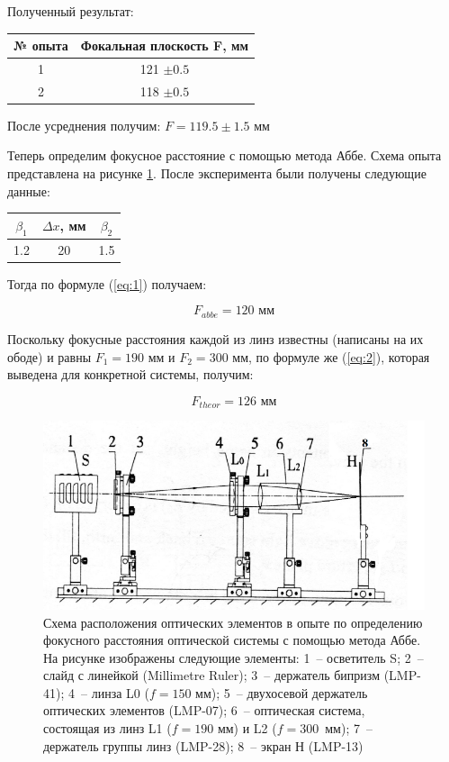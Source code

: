 \documentclass[a4paper, 12pt]{article}
\begin{document}
Полученный результат:

\begin{center}
	\begin{tabular}{|c|c|}
		\hline
		№ опыта & Фокальная плоскость F, мм\\
		\hline
		1 & 121 $\pm 0.5$  \\
		\hline
		2 & 118 $ \pm 0.5$ \\
		\hline
	\end{tabular}
\end{center}

После усреднения получим:
$F = 119.5\pm 1.5$ мм

Теперь определим фокусное расстояние с помощью метода Аббе. Схема опыта представлена на рисунке \ref{fig:3_1}. После эксперимента были получены следующие данные:

\begin{center}
	\begin{tabular}{|c|c|c|}
		\hline
		$\beta_1$ & $\Delta x$, мм & $\beta_2$ \\
		\hline
		1.2 & 20 & 1.5 \\
		\hline
	\end{tabular}
\end{center}

Тогда по формуле (\ref{eq:1}) получаем:

\begin{equation*}
	F_{abbe} = 120 \text{ мм}
\end{equation*}

Поскольку фокусные расстояния каждой из линз известны (написаны на их ободе) и равны $F_1 = 190 \text{ мм}$ и $F_2 = 300 \text{ мм}$, по формуле же (\ref{eq:2}), которая выведена для конкретной системы, получим:

\begin{equation*}
	F_{theor} = 126 \text{ мм}
\end{equation*}


\begin{figure}[H]
	\centering
	\includegraphics[width=0.7\linewidth]{5}
	\caption{Схема расположения оптических элементов в опыте по определению фокусного расстояния оптической системы с помощью метода Аббе. На рисунке изображены следующие элементы: 1~-- осветитель S; 2~-- слайд с линейкой (Millimetre Ruler); 3~-- держатель бипризм (LMP-41); 4~-- линза L0 ($f=150$ мм); 5~-- двухосевой держатель оптических элементов (LMP-07); 6~-- оптическая система, состоящая из линз L1 ($f=190$ мм) и L2 ($f=300$~мм); 7~-- держатель группы линз (LMP-28); 8~-- экран Н (LMP-13)}
	\label{fig:3_1}
\end{figure}
\end{document}
